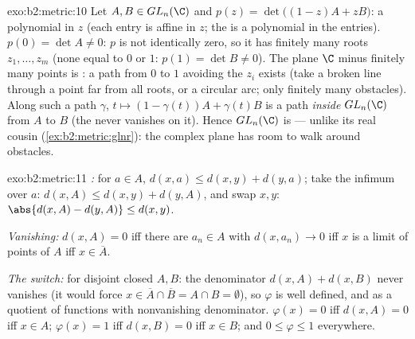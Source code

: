\begin{solution}{exo:b2:metric:10}
Let $A, B \in GL_n(\C)$ and $p(z) = \det\bigl((1-z)A + zB\bigr)$: a
polynomial in $z$ (each entry is affine in $z$; the  is a
polynomial in the entries). $p(0) = \det A \neq 0$: $p$ is not
identically zero, so it has finitely many roots $z_1, \dots, z_m$
(none equal to $0$ or $1$: $p(1) = \det B \neq 0$). The plane $\C$
minus finitely many points is : a path from $0$ to $1$
avoiding the $z_i$ exists (take a broken line through a point far
from all roots, or a circular arc; only finitely many obstacles).
Along such a path $\gamma$, $t \mapsto (1 - \gamma(t))A +
\gamma(t)B$ is a  path \emph{inside} $GL_n(\C)$ from $A$
to $B$ (the  never vanishes on it). Hence $GL_n(\C)$ is
 --- unlike its real cousin
(\cref{ex:b2:metric:glnr}): the complex plane has room to walk
around obstacles.
\end{solution}

\begin{solution}{exo:b2:metric:11}
\emph{:} for $a \in A$, $d(x, a) \leq d(x, y) + d(y,
a)$; take the infimum over $a$: $d(x, A) \leq d(x, y) + d(y,
A)$, and swap $x, y$: $\abs{d(x,A) - d(y,A)} \leq d(x,y)$.

\emph{Vanishing:} $d(x, A) = 0$ iff there are $a_n \in A$ with
$d(x, a_n) \to 0$ iff $x$ is a limit of points of $A$ iff $x \in
\overline A$.

\emph{The switch:} for disjoint closed $A, B$: the denominator
$d(x,A) + d(x,B)$ never vanishes (it would force $x \in \overline
A \cap \overline B = A \cap B = \emptyset$), so $\varphi$ is well
defined, and  as a quotient of  functions
with nonvanishing denominator. $\varphi(x) = 0$ iff $d(x, A) = 0$
iff $x \in A$; $\varphi(x) = 1$ iff $d(x, B) = 0$ iff $x \in B$;
and $0 \leq \varphi \leq 1$ everywhere.
\end{solution}


